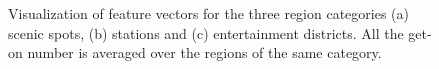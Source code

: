 \documentclass[a4paper, 10pt, conference]{ieeeconf}      %
\begin{document}
\begin{figure}[htbp]
    \centering
    \caption{Visualization of feature vectors for the three region categories (a) scenic spots, (b) stations and (c) entertainment districts. All the get-on number is averaged over the regions of the same category.}
    \label{fig:my_label_3}
\end{figure}
\end{document}
